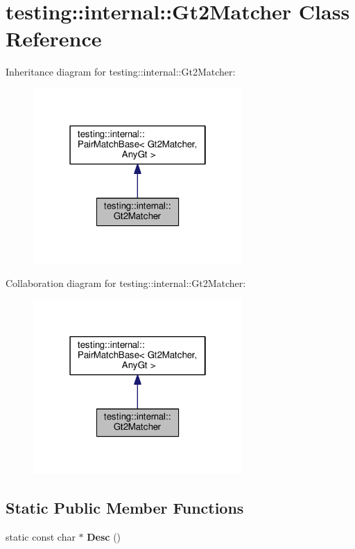 \hypertarget{classtesting_1_1internal_1_1Gt2Matcher}{}\section{testing\+:\+:internal\+:\+:Gt2\+Matcher Class Reference}
\label{classtesting_1_1internal_1_1Gt2Matcher}


Inheritance diagram for testing\+:\+:internal\+:\+:Gt2\+Matcher\+:\nopagebreak
\begin{figure}[H]
\begin{center}
\leavevmode
\includegraphics[width=226pt]{classtesting_1_1internal_1_1Gt2Matcher__inherit__graph}
\end{center}
\end{figure}


Collaboration diagram for testing\+:\+:internal\+:\+:Gt2\+Matcher\+:\nopagebreak
\begin{figure}[H]
\begin{center}
\leavevmode
\includegraphics[width=226pt]{classtesting_1_1internal_1_1Gt2Matcher__coll__graph}
\end{center}
\end{figure}
\subsection*{Static Public Member Functions}
\begin{DoxyCompactItemize}
\item 
static const char $\ast$ {\bfseries Desc} ()\hypertarget{classtesting_1_1internal_1_1Gt2Matcher_a195be80a6c19ff32fc7b6c1e26aa60da}{}\label{classtesting_1_1internal_1_1Gt2Matcher_a195be80a6c19ff32fc7b6c1e26aa60da}

\end{DoxyCompactItemize}

